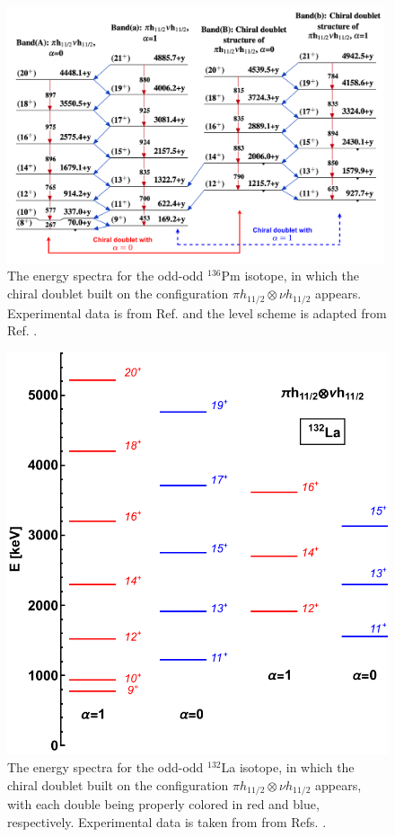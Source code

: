 \begin{figure}
    \centering
    \includegraphics[width=0.99\textwidth]{Chapters/Figures/Chiral_136Pm.pdf}
    \caption{The energy spectra for the odd-odd $^{136}$Pm isotope, in which the chiral doublet built on the configuration $\pi h_{11/2}\otimes\nu h_{11/2}$ appears. Experimental data is from Ref. \cite{mccutchan2018nuclear} and the level scheme is adapted from Ref. \cite{bhat1992evaluated}.}
    \label{chiral-bands-1}
\end{figure}

\begin{figure}
    \centering
    \includegraphics[scale=0.7]{Chapters/Figures/chiral_bands_132La.pdf}
    \caption{The energy spectra for the odd-odd $^{132}$La isotope, in which the chiral doublet built on the configuration $\pi h_{11/2}\otimes\nu h_{11/2}$ appears, with each double being properly colored in red and blue, respectively. Experimental data is taken from from Refs. \cite{grodner2004dsam,grodner2005lifetime}.}
    \label{chiral-bands-2}
\end{figure}

